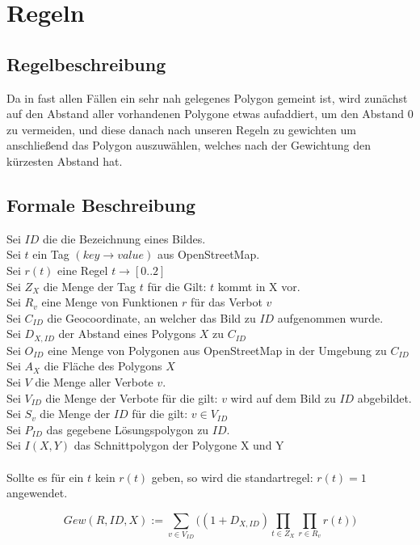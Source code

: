 \section{Regeln}

\subsection{Regelbeschreibung}
Da in fast allen Fällen ein sehr nah gelegenes Polygon gemeint ist, wird zunächst auf den Abstand aller vorhandenen Polygone etwas aufaddiert,
um den Abstand 0 zu vermeiden, und diese danach nach unseren Regeln zu gewichten um anschließend das Polygon auszuwählen,
welches nach der Gewichtung den kürzesten Abstand hat.

\subsection{Formale Beschreibung}
Sei $ID$ die die Bezeichnung eines Bildes.\\
Sei $t$ ein Tag $(key \to value)$ aus OpenStreetMap.\\
Sei $r(t)$ eine Regel $t \to [0..2]$ \\
Sei $Z_{X}$ die Menge der Tag $t$ für die Gilt: $t$ kommt in X vor. \\
Sei $R_v$ eine Menge von Funktionen $r$ für das Verbot $v$\\
Sei $C_{ID}$ die Geocoordinate, an welcher das Bild zu $ID$ aufgenommen wurde. \\
Sei $D_{X,ID}$ der Abstand eines Polygons $X$ zu $C_{ID}$ \\
Sei $O_{ID}$ eine Menge von Polygonen aus OpenStreetMap in der Umgebung zu $C_{ID}$\\
Sei $A_{X}$ die Fläche des Polygons $X$\\
Sei $V$ die Menge aller Verbote $v$.\\
Sei $V_{ID}$ die Menge der Verbote für die gilt: $v$ wird auf dem Bild zu $ID$ abgebildet.\\
Sei $S_{v}$ die Menge der $ID$ für die gilt: $v \in V_{ID}$\\
Sei $P_{ID}$ das gegebene Lösungspolygon zu $ID$.\\
Sei $I(X,Y)$ das Schnittpolygon der Polygone X und Y\\
\\
Sollte es für ein $t$ kein $r(t)$ geben, so wird die standartregel:
$r(t) = 1$ angewendet.

\begin{equation}
Gew(R,ID,X) := \sum_{v \in V_{ID}} \Big((1 + D_{X,ID})\prod_{t \in Z_X} \prod_{r \in R_v} r(t)\Big)
\end{equation}

